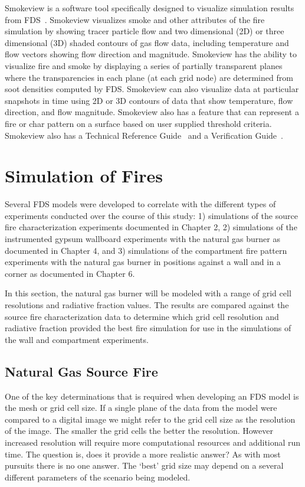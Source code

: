 \documentclass[twoside]{uocthesis}
\begin{document}
{Smokeview is a software tool specifically designed to visualize simulation results from FDS~\cite{Smokeview_Users_Guide}. Smokeview visualizes smoke and other attributes of the fire simulation by showing tracer particle flow and two dimensional (2D) or three dimensional (3D) shaded contours of gas flow data, including temperature and flow vectors showing flow direction and magnitude. Smokeview has the ability to visualize fire and smoke by displaying a series of partially transparent planes where the transparencies in each plane (at each grid node) are determined from soot densities computed by FDS. Smokeview can also visualize data at particular snapshots in time using 2D or 3D contours of data that show temperature, flow direction, and flow magnitude.  Smokeview also has a feature that can represent a fire or char pattern on a surface based on user supplied threshold criteria.  Smokeview also has a Technical Reference Guide~\cite{Smokeview_Tech_Guide} and a Verification Guide~\cite{Smokeview_Verification_Guide}.

\section{Simulation of Fires}

Several FDS models were developed to correlate with the different types of experiments conducted over the course of this study: 1) simulations of the source fire characterization experiments documented in Chapter 2, 2) simulations of the instrumented gypsum wallboard experiments with the natural gas burner as documented in Chapter 4, and 3) simulations of the compartment fire pattern experiments with the natural gas burner in positions against a wall and in a corner as documented in Chapter 6.  

In this section, the natural gas burner will be modeled with a range of grid cell resolutions and radiative fraction values.  The results are compared against the source fire characterization data to determine which grid cell resolution and radiative fraction provided the best fire simulation for use in the simulations of the wall and compartment experiments.      

\subsection{Natural Gas Source Fire}

One of the key determinations that is required when developing an FDS model is the mesh or grid cell size.  If a single plane of the data from the model were compared to a digital image we might refer to the grid cell size as the resolution of the image.  The smaller the grid cells the better the resolution. However increased resolution will require more computational resources and additional run time. The question is, does it provide a more realistic answer?  As with most pursuits there is no one answer.  The `best' grid size may depend on a several different parameters of the scenario being modeled. 

}
\end{document}
